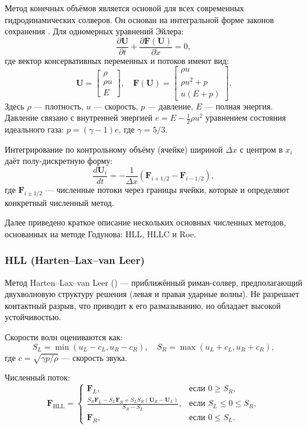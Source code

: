 \documentclass[a4paper,12pt]{extarticle}
\begin{document}
Метод конечных объёмов является основой для всех современных гидродинамических солверов. Он основан на интегральной форме законов сохранения \cite[Глава 4]{toro2009}. Для одномерных уравнений Эйлера:
\[
\frac{\partial \mathbf{U}}{\partial t} + \frac{\partial \mathbf{F}(\mathbf{U})}{\partial x} = 0,
\]
где вектор консервативных переменных и потоков имеют вид:
\[
\mathbf{U} = \begin{bmatrix} \rho \\ \rho u \\ E \end{bmatrix}, \quad
\mathbf{F}(\mathbf{U}) = \begin{bmatrix} \rho u \\ \rho u^2 + p \\ u(E + p) \end{bmatrix}.
\]
Здесь $\rho$ — плотность, $u$ — скорость, $p$ — давление, $E$ — полная энергия. Давление связано с внутренней энергией $e = E - \frac{1}{2}\rho u^2$ уравнением состояния идеального газа: $p = (\gamma - 1) e$, где $\gamma = 5/3$.

Интегрирование по контрольному объёму (ячейке) шириной $\Delta x$ с центром в $x_i$ даёт полу-дискретную форму:
\[
\frac{d\mathbf{U}_i}{dt} = -\frac{1}{\Delta x} \left( \mathbf{F}_{i+1/2} - \mathbf{F}_{i-1/2} \right),
\]
где $\mathbf{F}_{i\pm1/2}$ — численные потоки через границы ячейки, которые и определяют конкретный численный метод.

Далее приведено краткое описание нескольких основных численных методов, основанных на методе Годунова: HLL, HLLC и Roe.

\subsubsection{HLL (Harten–Lax–van Leer)}

Метод Harten–Lax–van Leer (\cite[Глава 10.2]{toro2009}) — приближённый риман-солвер, предполагающий двухволновую структуру решения (левая и правая ударные волны). Не разрешает контактный разрыв, что приводит к его размазыванию, но обладает высокой устойчивостью.

Скорости волн оцениваются как:
\[
S_L = \min(u_L - c_L, u_R - c_R), \quad S_R = \max(u_L + c_L, u_R + c_R),
\]
где $c = \sqrt{\gamma p / \rho}$ — скорость звука.

Численный поток:
\[
\mathbf{F}_{\text{HLL}} = 
\begin{cases}
\mathbf{F}_L, & \text{если } 0 \geq S_R, \\
\frac{S_R \mathbf{F}_L - S_L \mathbf{F}_R + S_L S_R (\mathbf{U}_R - \mathbf{U}_L)}{S_R - S_L}, & \text{если } S_L \leq 0 \leq S_R, \\
\mathbf{F}_R, & \text{если } 0 \leq S_L.
\end{cases}
\]
\end{document}
